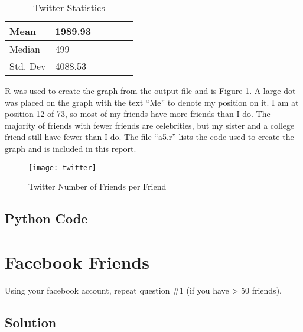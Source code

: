 \documentclass[paper=a4, fontsize=11pt]{scrartcl} %
\numberwithin{equation}{section} %
\numberwithin{figure}{section} %
\numberwithin{table}{section} %
\begin{document}
\begin{table}[H]
\centering
\begin{tabular}{|l|l|l|l|l|l|}
\hline
Mean & 1989.93 \\
\hline
Median &  499 \\
\hline
Std. Dev &  4088.53\\
\hline
\end{tabular}
\caption{Twitter Statistics}
\label{table:tw-calc}
\end{table}


R was used to create the graph from the output file and is Figure \ref{fig:twitter}.
A large dot was placed on the graph with the text ``Me'' to denote my position on it.\cite{bib:rline}
I am at position 12 of 73, so most of my friends have more friends than I do.  
The majority of friends with fewer friends are celebrities, but my sister and a college friend still have fewer than I do.
The file ``a5.r'' lists the code used to create the graph and is included in this report.

\begin{figure}[H]
\texttt{[image: twitter]}
\caption{Twitter Number of Friends per Friend}
\label{fig:twitter}
\end{figure}

\subsection{Python Code}






\newpage 

\section{Facebook Friends}
Using your facebook account, repeat question \#1 (if you have >
50 friends).

\subsection{Solution}
\end{document}
